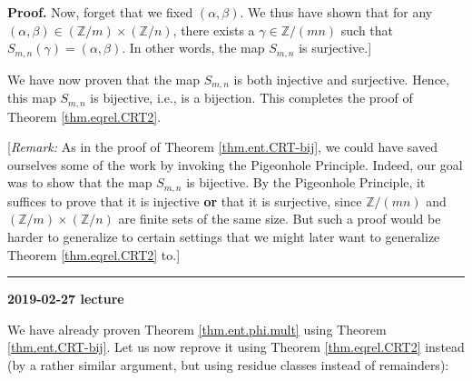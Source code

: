 \documentclass[numbers=enddot,12pt,final,onecolumn,notitlepage]{scrartcl}%
\numberwithin{exer}{subsection}
\theoremstyle{definition}
\newenvironment{proof}[1][Proof]{\noindent\textbf{#1.} }{\ \rule{0.5em}{0.5em}}
\begin{document}
\begin{proof}
Now, forget that we fixed $\left(  \alpha,\beta\right)  $. We thus have shown
that for any $\left(  \alpha,\beta\right)  \in\left(  \mathbb{Z}/m\right)
\times\left(  \mathbb{Z}/n\right)  $, there exists a $\gamma\in\mathbb{Z}%
/\left(  mn\right)  $ such that $S_{m,n}\left(  \gamma\right)  =\left(
\alpha,\beta\right)  $. In other words, the map $S_{m,n}$ is surjective.]

We have now proven that the map $S_{m,n}$ is both injective and surjective.
Hence, this map $S_{m,n}$ is bijective, i.e., is a bijection. This completes
the proof of Theorem \ref{thm.eqrel.CRT2}.

[\textit{Remark:} As in the proof of Theorem \ref{thm.ent.CRT-bij}, we could
have saved ourselves some of the work by invoking the Pigeonhole Principle.
Indeed, our goal was to show that the map $S_{m,n}$ is bijective. By the
Pigeonhole Principle, it suffices to prove that it is injective \textbf{or}
that it is surjective, since $\mathbb{Z}/\left(  mn\right)  $ and $\left(
\mathbb{Z}/m\right)  \times\left(  \mathbb{Z}/n\right)  $ are finite sets of
the same size. But such a proof would be harder to generalize to certain
settings that we might later want to generalize Theorem \ref{thm.eqrel.CRT2} to.]
\end{proof}

\begin{center}
\textbf{2019-02-27 lecture}
\end{center}

We have already proven Theorem \ref{thm.ent.phi.mult} using Theorem
\ref{thm.ent.CRT-bij}. Let us now reprove it using Theorem
\ref{thm.eqrel.CRT2} instead (by a rather similar argument, but using residue
classes instead of remainders):
\end{document}
